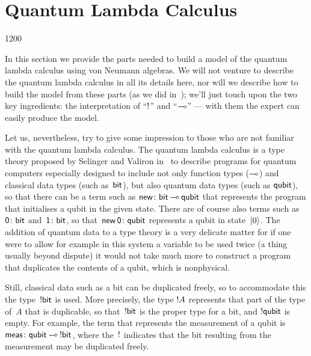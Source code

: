 \section{Quantum Lambda Calculus}
\label{S:model}
\begin{parsec}{1200}%
\begin{point}{10}%
In this section we provide
the parts needed
to build a model
	of the quantum lambda calculus
using von Neumann algebras.
We will not venture
to describe the quantum lambda calculus
in all its details here,
nor will we describe how to build the model
from these parts
(as we did in~\cite{model});
we'll just touch upon
the two key ingredients:
the interpretation of ``$\mathord{!}$'' and ``$\mathbin{\multimap}$''%
---
with them the expert
can easily produce the model.

Let us, nevertheless, try to give some impression to those who are not familiar 
with the quantum lambda calculus.
The quantum lambda calculus is a type theory
proposed by Selinger and Valiron in~\cite{selinger2005,selinger2006}
to describe programs for quantum computers
especially designed
to include 
not only
function types ($\mathbin{\multimap}$)
and
classical data types (such as~$\mathsf{bit}$),
but also quantum data types
(such as $\mathsf{qubit}$),
so that there can be a term such as
$\mathsf{new}\colon \mathsf{bit}\mathbin{\multimap} \mathsf{qubit}$
that represents the program
that initialises a qubit in the given state.
There are of course also terms
such as
$\mathsf{0}\colon \mathsf{bit}$
and~$\mathsf{1}\colon \mathsf{bit}$,
so that~$\mathsf{new}\,\mathsf{0}\colon \mathsf{qubit}$
represents a qubit in state~$\ket{0}$.
The addition of quantum data 
to a type theory
is a very delicate matter
for if one were to allow
for example
in this system
a variable to be used twice
(a thing usually beyond dispute)
it would not take much more
to construct
a program
that duplicates the contents
of a qubit,
which is nonphysical.

Still, classical data
such as a bit
can be duplicated freely,
so to accommodate this 
the type~$\mathord{!} \mathsf{bit}$ is used.
More precisely,
the type
$\mathord{!} A$
represents that part of the type of~$A$ that is duplicable,
so that~$\mathord{!} \mathsf{bit}$
is the proper type for a bit,
and $\mathord{!}\mathsf{qubit}$ is empty.
For example,
the term that represents the measurement
of a qubit is~$\mathsf{meas}\colon \mathsf{qubit}\mathbin{\multimap} \mathord{!}\mathsf{bit}$,
where the~$\mathord{!}$ indicates that the bit resulting from the measurement
may be duplicated freely.


\end{point}
\end{parsec}
